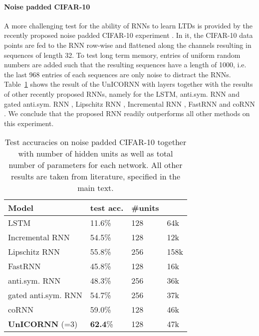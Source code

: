 \documentclass{article}
\newcommand{\Tref}[1]{Table~\ref{#1}}
\begin{document}
\paragraph{Noise padded CIFAR-10} 
A more challenging test for the ability of RNNs to learn LTDs is provided by the recently proposed noise padded CIFAR-10 experiment \citep{anti}. In it, the CIFAR-10 data points \citep{cifar} are fed to the RNN row-wise and flattened along the channels resulting in sequences of length 32. To test long term memory, entries of uniform random numbers are added such that the resulting sequences have a length of 1000, i.e. the last 968 entries of each sequences are only noise to distract the RNNs. \Tref{tab:cifar} shows the result of the UnICORNN with  layers together with the results of other recently proposed RNNs, namely for the LSTM, anti.sym. RNN and gated anti.sym. RNN \citep{anti}, Lipschitz RNN \citep{lip_rnn}, Incremental RNN \citep{inc_rnn}, FastRNN \citep{fastrnn} and coRNN \cite{coRNN}. We conclude that the proposed RNN readily outperforms all other methods on this experiment.
\begin{table}[ht]
\caption{Test accuracies on noise padded CIFAR-10 together with number of hidden units as well as total number of parameters  for each network. All other results are taken from literature, specified in the main text.}
\label{tab:cifar}
\vskip 0.15in
\begin{center}
\begin{small}
\begin{sc}
\begin{tabular}{llll}
\toprule
Model     & test acc. & \#units &  \\
\midrule
LSTM & 11.6\% & 128 & 64k\\
Incremental RNN& 54.5\% & 128 & 12k\\
Lipschitz RNN & 55.8\%  & 256 & 158k\\
FastRNN & 45.8\% & 128 & 16k\\
anti.sym. RNN & 48.3\% & 256 & 36k\\
gated anti.sym. RNN & 54.7\% & 256 & 37k \\
coRNN & 59.0\% & 128 & 46k \\
\textbf{UnICORNN} (=3) & \textbf{62.4}\% & 128 & 47k\\
\bottomrule
\end{tabular}
\end{sc}
\end{small}
\end{center}
\vskip -0.1in
\end{table}
\end{document}
